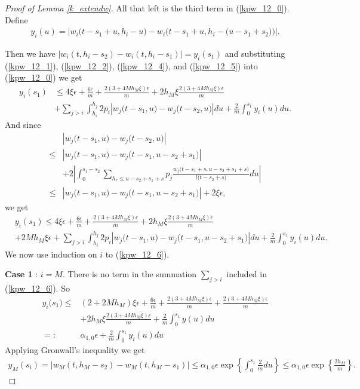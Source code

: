 \documentclass[12pt]{article}
\numberwithin{equation}{section}  %
\begin{document}
\begin{proof}[Proof of Lemma \ref{k_extendw}]
All that left is the third term in (\ref{kpw_12_0}). Define
\begin{align}
y_i(u)=\left|w_i\big(t-s_1+u,h_i-u\big)-w_i\big(t-s_1+u,h_i-\big(u-s_1+s_2\big)\big)\right|\label{kpw_12_5}.
\end{align}

Then we have $\left|w_i(t,h_i-s_2)-w_i(t,h_i-s_1)\right|=y_i(s_1)$ and substituting (\ref{kpw_12_1}), (\ref{kpw_12_2}), (\ref{kpw_12_4}), and (\ref{kpw_12_5}) into (\ref{kpw_12_0}) we get
\begin{align*} 
y_i(s_1)&\leq 4\xi\epsilon+\frac{6\epsilon}{m}+\frac{2(3+4M h_M\xi)\epsilon}{m}
+2h_M\xi \frac{2(3+4M h_M \xi)\epsilon}{m}\\
&+\sum_{j>i}\int_{ h_i}^{h_j}2p_i
\left|
w_j\big(t-s_1,u\big)-w_j\big(t-s_2,u\big)
\right|
du+\frac{2}{m}\int_{0}^{s_1}y_i(u)du.
\end{align*} 
And since
{
\begin{align*} 
&\left|
w_j\big(t-s_1,u\big)-w_j\big(t-s_2,u\big)
\right|\\
\leq& 
\left|
w_j\big(t-s_1,u\big)-w_j\big(t-s_1,u-s_2+s_1\big)
\right|\nonumber\\
&+2\left|
\int_{0}^{s_1-s_2}\sum_{h_r\leq u-s_2+s_1+s}p_j\frac{w_j\big(t-s_1+s,u-s_2+s_1+s\big)}{l\big(t-s_2+s\big)}du
\right|\nonumber\\
\leq&\left|
w_j\big(t-s_1,u\big)-w_j\big(t-s_1,u-s_2+s_1\big)
\right|+2\xi\epsilon,
\end{align*}}
we get
\begin{align} 
&y_i(s_1)\leq 4\xi\epsilon+\frac{6\epsilon}{m}+\frac{2(3+4M h_M \xi)\epsilon}{m}
+2h_M\xi \frac{2(3+4M h_M \xi)\epsilon}{m}\nonumber\\
&+2Mh_M\xi\epsilon+\sum_{j>i}\int_{ h_i}^{h_j}2p_i
\left|
w_j\big(t-s_1,u\big)-w_j\big(t-s_1,u-s_2+s_1\big)
\right|
du+\frac{2}{m}\int_{0}^{s_1}y_i(u)du\label{kpw_12_6}.
\end{align} 
We now use induction on $i$ to (\ref{kpw_12_6}).

\textbf{Case 1} : $i=M$. There is no term in the summation $\sum_{j>i}$ included in (\ref{kpw_12_6}). So 
\begin{align*} 
y_i\big(s_1\big)\leq& (2+2Mh_M)\xi\epsilon+\frac{6\epsilon}{m}+\frac{2(3+4 M h_M \xi)\epsilon}{m}
+\frac{2(3+4M h_M \xi)\epsilon}{m}\\
&+2h_M\xi \frac{2(3+4 M h_M \xi)\epsilon}{m}
+\frac{2}{m}\int_{0}^{s_1}y(u)du\\
=:&\alpha_{1,0}\epsilon+\frac{2}{m}\int_{0}^{s_1}y_i(u)du
\end{align*} 
Applying Gronwall's inequality we get
\begin{align*} 
y_M(s_i)=\left|w_M(t,h_M-s_2)-w_M(t,h_M-s_1)\right|\leq\alpha_{1,0}\epsilon \exp\left\{\int_{0}^{s_1}\frac{2}{m}du\right\}\leq\alpha_{1,0}\epsilon \exp\left\{\frac{2h_M}{m}\right\}.
\end{align*} 


\end{proof}
\end{document}
